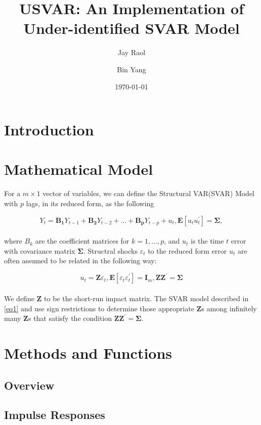 \documentclass[11pt]{article}\usepackage[]{graphicx}\usepackage[]{color}
\title{USVAR: An Implementation of Under-identified SVAR Model}
\author{Jay Raol \and Bin Yang}
\date{\today}
\begin{document}
\maketitle

\abstract{}

\section{Introduction}

\section{Mathematical Model}
For a $m \times 1$ vector of variables, we can define the Structural VAR(SVAR) Model with $p$ lags, in its reduced form, as the following

\begin{equation} \label{eq1}
Y_t = \mathbf{B_1} Y_{t-1} + \mathbf{B_2} Y_{t-2} + \ldots + \mathbf{B_p} Y_{t-p} + u_t, \mathbf{E} [u_t u_t^{'}] = \mathbf{\Sigma} ,
\end{equation}
\\
where $B_{k}$ are the coefficient matrices for $k = 1, \ldots, p$, and $u_t$ is the time $t$ error with covariance matrix $\mathbf{\Sigma}$. Structral shocks $\varepsilon_{t}$ to the reduced form error $u_t$ are often assumed to be related in the following way:

\begin{equation}
u_t = \mathbf{Z} \varepsilon_{t},  \mathbf{E} [\varepsilon_{t} \varepsilon_{t}^{'}] = \mathbf{I}_m,  \mathbf{Z}\mathbf{Z}^{'} = \mathbf{\Sigma}
\end{equation}
\\
We define $\mathbf{Z}$ to be the short-run impact matrix. The SVAR model described in \ref{eq1} and use sign restrictions to determine those appropriate $\mathbf{Z}$s among infinitely many $\mathbf{Z}$s that satisfy the condition $\mathbf{Z} \mathbf{Z}^{'} = \mathbf{\Sigma}$.

\section{Methods and Functions}
  \subsection{Overview}
  
  \subsection{Impulse Responses}
  
\end{document}
